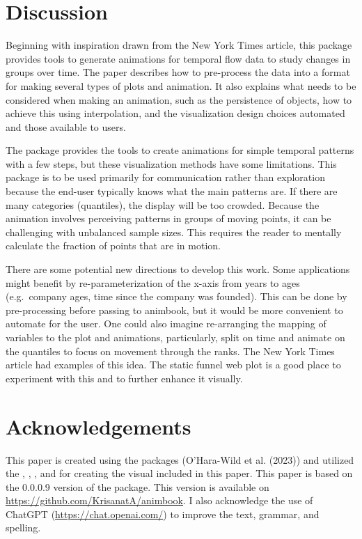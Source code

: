 \hypertarget{discussion}{%
\section{Discussion}\label{discussion}}

Beginning with inspiration drawn from the New York Times article, this package provides tools to generate animations for temporal flow data to study changes in groups over time. The paper describes how to pre-process the data into a format for making several types of plots and animation. It also explains what needs to be considered when making an animation, such as the persistence of objects, how to achieve this using interpolation, and the visualization design choices automated and those available to users.

The package provides the tools to create animations for simple temporal patterns with a few steps, but these visualization methods have some limitations. This package is to be used primarily for communication rather than exploration because the end-user typically knows what the main patterns are. If there are many categories (quantiles), the display will be too crowded. Because the animation involves perceiving patterns in groups of moving points, it can be challenging with unbalanced sample sizes. This requires the reader to mentally calculate the fraction of points that are in motion.

There are some potential new directions to develop this work. Some applications might benefit by re-parameterization of the x-axis from years to ages (e.g.~company ages, time since the company was founded). This can be done by pre-processing before passing to animbook, but it would be more convenient to automate for the user. One could also imagine re-arranging the mapping of variables to the plot and animations, particularly, split on time and animate on the quantiles to focus on movement through the ranks. The New York Times article had examples of this idea. The static funnel web plot is a good place to experiment with this and to further enhance it visually.

\hypertarget{acknowledgements}{%
\section*{Acknowledgements}\label{acknowledgements}}

This paper is created using the  packages (O'Hara-Wild et al. (2023)) and utilized the , , , and  for creating the visual included in this paper. This paper is based on the 0.0.0.9 version of the  package. This version is available on \url{https://github.com/KrisanatA/animbook}.
I also acknowledge the use of ChatGPT (\url{https://chat.openai.com/}) to improve the text, grammar, and spelling.


